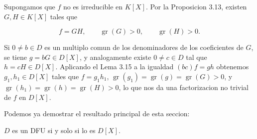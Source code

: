 \begin{proofbox}
Supongamos que $f$ no es irreducible en $K[X]$. Por la Proposicion 3.13, existen $G,H\in K[X]$ tales que

\[f=GH,\qquad\operatorname{gr}(G)>0,\qquad\operatorname{gr}(H)>0.\]

Si $0\neq b\in D$ es un multiplo comun de los denominadores de los coeficientes de $G$, se tiene $g=bG\in D[X]$, y analogamente existe $0\neq c\in D$ tal que $h=cH\in D[X]$. Aplicando el Lema 3.15 a la igualdad $(bc)f=gh$ obtenemos $g_{1},h_{1}\in D[X]$ tales que $f=g_{1}h_{1}$, $\operatorname{gr}(g_{1})=\operatorname{gr}(g)=\operatorname{gr}(G)>0$, y $\operatorname{gr}(h_{1})=\operatorname{gr}(h)=\operatorname{gr}(H)>0$, lo que nos da una factorizacion no trivial de $f$ en $D[X]$.
\end{proofbox}

Podemos ya demostrar el resultado principal de esta seccion:

\begin{theorem}{}{}
$D$ es un DFU si y solo si lo es $D[X]$.
\end{theorem}


